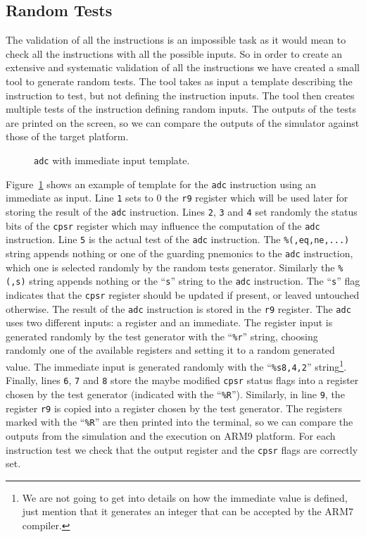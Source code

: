 \subsection{Random Tests}
\label{sec:random_tests}

The validation of all the instructions is an impossible task as it would mean to check all the instructions with all the possible inputs.
So in order to create an extensive and systematic validation of all the instructions we have created a small tool to generate random tests.
The tool takes as input a template describing the instruction to test, but not defining the instruction inputs.
The tool then creates multiple tests of the instruction defining random inputs.
The outputs of the tests are printed on the screen, so we can compare the outputs of the simulator against those of the target platform.

\begin{figure}[!h]
	
	\caption{\texttt{adc} with immediate input template.}
	\label{fig:adc_imm_template}
\end{figure}

Figure~\ref{fig:adc_imm_template} shows an example of template for the \texttt{adc} instruction using an immediate as input.
Line \texttt{1} sets to 0 the \texttt{r9} register which will be used later for storing the result of the \texttt{adc} instruction.
Lines \texttt{2}, \texttt{3} and \texttt{4} set randomly the status bits of the \texttt{cpsr} register which may influence the computation of the \texttt{adc} instruction.
Line \texttt{5} is the actual test of the \texttt{adc} instruction. 
The \texttt{\%(,eq,ne,...)} string appends nothing or one of the guarding pnemonics to the \texttt{adc} instruction, which one is selected randomly by the random tests generator.
Similarly the \texttt{\%(,s)} string appends nothing or the ``\texttt{s}'' string to the \texttt{adc} instruction.
The ``\texttt{s}'' flag indicates that the \texttt{cpsr} register should be updated if present, or leaved untouched otherwise.
The result of the \texttt{adc} instruction is stored in the \texttt{r9} register.
The \texttt{adc} uses two different inputs: a register and an immediate.
The register input is generated randomly by the test generator with the ``\texttt{\%r}'' string, choosing randomly one of the available registers and setting it to a random generated value.
The immediate input is generated randomly with the ``\texttt{\%s8,4,2}'' string\footnote{We are not going to get into details on how the immediate value is defined, just mention that it generates an integer that can be accepted by the ARM7 compiler.}.
Finally, lines \texttt{6}, \texttt{7} and \texttt{8} store the maybe modified \texttt{cpsr} status flags into a register chosen by the test generator (indicated with the ``\texttt{\%R}'').
Similarly, in line \texttt{9}, the register \texttt{r9} is copied into a register chosen by the test generator.
The registers marked with the ``\texttt{\%R}'' are then printed into the terminal, so we can compare the outputs from the simulation and the execution on ARM9 platform.
For each instruction test we check that the output register and the \texttt{cpsr} flags are correctly set.

